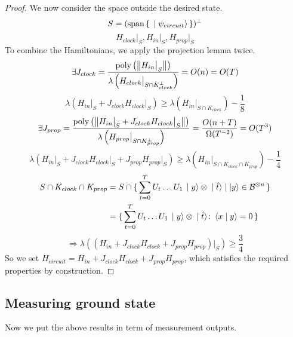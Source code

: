 \begin{proof}
We now consider the space outside the desired state.
$$S=(\operatorname*{\operatorname{span}}\set{\ket{\psi_{circuit}}})^\bot$$
$$H_{clock}\big|_S,H_{in}\big|_S,H_{prop}\big|_S$$
To combine the Hamiltonians, we apply the projection lemma twice.
$$\exists J_{clock}
=\frac{\operatorname*{\operatorname{poly}}\left(\left\lVert H_{in}\big|_S\right\rVert\right)}{\lambda\left(H_{clock}\big|_{S\cap K^\bot_{clock}}\right)}
=O(n)=O(T)$$
$$\lambda(H_{in}\big|_S+J_{clock}H_{clock}\big|_S)\geq
\lambda(H_{in}\big|_{S\cap K_{clock}})-\frac{1}{8}$$
$$\exists J_{prop}=\frac{\operatorname*{\operatorname{poly}}\left(\left\lVert H_{in}\big|_S+J_{clock}H_{clock}\big|_S\right\rVert\right)}{\lambda\left(H_{prop}\big|_{S\cap K^\bot_{prop}}\right)}
=\frac{O(n+T)}{\Omega(T^{-2})}=O(T^3)$$
$$\lambda(H_{in}\big|_S+J_{clock}H_{clock}\big|_S+J_{prop}H_{prop}\big|_S)\geq
\lambda(H_{in}\big|_{S\cap K_{clock}\cap K_{prop}})-\frac{1}{4}$$
\begin{align*}
	S\cap K_{clock}\cap K_{prop}&=S\cap\set{\sum_{t=0}^TU_t\ldots U_1\ket{y}\otimes\ket{\hat{t}}|\ket{y}\in\mathcal{B}^{\otimes n}}\\
	&=\set{\sum_{t=0}^TU_t\ldots U_1\ket{y}\otimes\ket{\hat{t}}\colon\braket{x|y}=0}
\end{align*}
$$\Rightarrow\lambda((H_{in}+J_{clock}H_{clock}+J_{prop}H_{prop})\big|_S)\geq\frac{3}{4}$$
So we set $H_{circuit}=H_{in}+J_{clock}H_{clock}+J_{prop}H_{prop}$, which satisfies the required properties by construction.
\end{proof}

\subsection{Measuring ground state}

Now we put the above results in term of measurement outputs.

